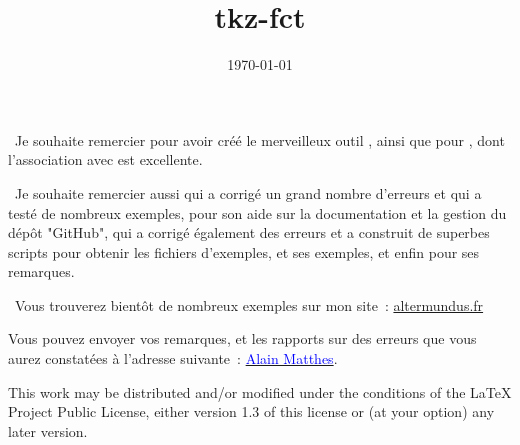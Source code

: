 \documentclass[DIV         = 14,
               fontsize    = 10,
               headinclude = false,
               index       = totoc,
               footinclude = false,
               twoside,
               headings    = small
               ]{tkz-doc}
\gdef\tkznameofpack{tkz-fct}
\begin{document}
\title{\tkznameofpack}
\date{\today}
\clearpage
\thispagestyle{empty}
\maketitle 

\clearpage

\nameoffile{\tkznameofpack} 


\presentation

\vspace*{24pt}  
\noindent\lefthand\ Je souhaite remercier  pour avoir créé le merveilleux outil \tkzname{\TIKZ}, ainsi que  pour , dont l'association avec  est excellente.

   
\vspace*{12pt}
\noindent\lefthand\ Je souhaite remercier aussi   qui a corrigé un grand nombre d'erreurs et qui a testé de nombreux exemples,  pour son aide sur la documentation et la gestion du dépôt "GitHub",  qui a corrigé également des erreurs et a construit de superbes scripts pour obtenir les fichiers d'exemples,    et ses exemples, et enfin   pour ses remarques.  

\vspace*{12pt}
\noindent\lefthand\ Vous trouverez bientôt de nombreux exemples sur mon site~: 
\href{http://altermundus.fr}{altermundus.fr}  

\vfill   
Vous pouvez envoyer vos remarques, et les rapports sur des erreurs que vous aurez constatées à l'adresse suivante~: \href{mailto:al.ma@mac.com}{\textcolor{blue}{Alain Matthes}}.
 
This work may be distributed and/or modified under the
conditions of the LaTeX Project Public License, either version 1.3
of this license or (at your option) any later version.
\end{document}
